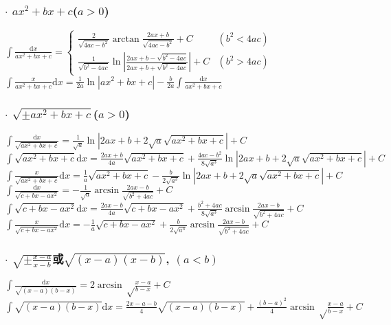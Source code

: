 \newcommand{\md}{\mathrm{d}}
\newcommand{\me}{\mathrm{e}}

\begin{footnotesize}

\subsubsection*{$\cdot$ $ax^2+bx+c$($a>0$)}

$ \int \frac{\md x}{ax^2+bx+c} = \begin{cases}
\frac{2}{\sqrt{4ac-b^2}}\arctan\frac{2ax+b}{\sqrt{4ac-b^2}} + C & (b^2 < 4ac) \\
\frac{1}{\sqrt{b^2-4ac}}\ln\left| \frac{2ax+b-\sqrt{b^2-4ac}}{2ax+b+\sqrt{b^2-4ac}} \right| + C & (b^2 > 4ac)
\end{cases} $
\\ $ \int \frac{x}{ax^2+bx+c} \md x = \frac{1}{2a} \ln |ax^2+bx+c| - \frac{b}{2a} \int \frac{\md x}{ax^2+bx+c} $

\subsubsection*{$\cdot$ $\sqrt{\pm ax^2+bx+c}$($a>0$)}

$ \int \frac{\md x}{\sqrt{ax^2+bx+c}} = \frac{1}{\sqrt{a}} \ln | 2ax+b+2\sqrt{a}\sqrt{ax^2+bx+c} | + C $
\\ $ \int \sqrt{ax^2+bx+c} \md x = \frac{2ax+b}{4a}\sqrt{ax^2+bx+c} +
	\frac{4ac-b^2}{8\sqrt{a^3}}\ln |2ax+b+2\sqrt{a}\sqrt{ax^2+bx+c}| + C $
\\ $ \int \frac{x}{\sqrt{ax^2+bx+c}} \md x = \frac{1}{a}\sqrt{ax^2+bx+c} -
	\frac{b}{2\sqrt{a^3}}\ln | 2ax+b+2\sqrt{a}\sqrt{ax^2+bx+c} | + C $
\\ $ \int \frac{\md x}{\sqrt{c+bx-ax^2}} = -\frac{1}{\sqrt{a}} \arcsin \frac{2ax-b}{\sqrt{b^2+4ac}} + C  $
\\ $ \int \sqrt{c+bx-ax^2} \md x = \frac{2ax-b}{4a}\sqrt{c+bx-ax^2} +
	\frac{b^2+4ac}{8\sqrt{a^3}}\arcsin\frac{2ax-b}{\sqrt{b^2+4ac}} + C $
\\ $ \int \frac{x}{\sqrt{c+bx-ax^2}} \md x = -\frac{1}{a}\sqrt{c+bx-ax^2} + \frac{b}{2\sqrt{a^3}}\arcsin\frac{2ax-b}{\sqrt{b^2+4ac}} + C $


\subsubsection*{$\cdot$ $\sqrt{\pm\frac{x-a}{x-b}}$或$\sqrt{(x-a)(x-b)}$, $(a<b)$}
$ \int \frac{\md x}{\sqrt{(x-a)(b-x)}} = 2\arcsin\sqrt\frac{x-a}{b-x} + C$
\\ $\int \sqrt{(x-a)(b-x)} \md x = \frac{2x-a-b}{4}\sqrt{(x-a)(b-x)} +
	\frac{(b-a)^2}{4}\arcsin\sqrt\frac{x-a}{b-x} + C$


\end{footnotesize}
